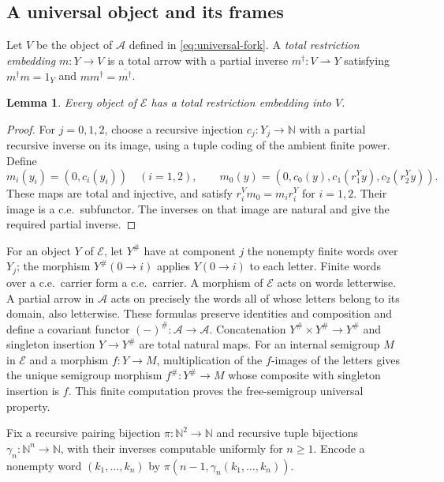 \documentclass[11pt]{article}
\newtheorem{lemma}[theorem]{Lemma}
\newcommand{\N}{\mathbb N}
\begin{document}
\subsection{A universal object and its frames}

Let $V$ be the object of $\mathcal A$ defined in
\eqref{eq:universal-fork}.
A \emph{total restriction embedding} $m:Y\to V$ is a total
arrow with a partial inverse $m^\dagger:V\rightharpoonup Y$
satisfying $m^\dagger m=1_Y$ and $mm^\dagger=\overline{m^\dagger}$.

\begin{lemma}\label{lem:fork-dominance}
Every object of $\mathcal E$ has a total restriction embedding
into $V$.
\end{lemma}
\begin{proof}
For $j=0,1,2$, choose a recursive injection $c_j:Y_j\to\N$
with a partial recursive inverse on its image, using a tuple
coding of the ambient finite power. Define
\[
 m_i(y_i)=(0,c_i(y_i))\quad(i=1,2),\qquad
 m_0(y)=(0,c_0(y),c_1(r_1^Yy),c_2(r_2^Yy)).
\]
These maps are total and injective, and satisfy
$r_i^Vm_0=m_i r_i^Y$ for $i=1,2$.
Their image is a c.e.\ subfunctor. The inverses on that image
are natural and give the required partial inverse.
\end{proof}

For an object $Y$ of $\mathcal E$, let $Y^\#$ have at component $j$ the
nonempty finite words over $Y_j$; the morphism $Y^\#(0\to i)$
applies $Y(0\to i)$ to each letter. Finite words over a c.e.\ carrier form
a c.e.\ carrier. A morphism of $\mathcal E$ acts on words letterwise.
A partial arrow in $\mathcal A$ acts on precisely the words all of whose
letters belong to its domain, also letterwise. These formulas
preserve identities and composition and define a covariant functor
$(-)^\#:\mathcal A\to\mathcal A$. Concatenation
$Y^\#\times Y^\#\to Y^\#$ and singleton insertion
$Y\to Y^\#$ are total natural maps. For an internal semigroup $M$
in $\mathcal E$ and a morphism $f:Y\to M$, multiplication of the
$f$-images of the letters gives the unique semigroup morphism
$f^\#:Y^\#\to M$ whose composite with singleton insertion is $f$.
This finite computation proves the free-semigroup universal property.

Fix a recursive pairing bijection
$\pi:\N^2\to\N$ and recursive tuple bijections
$\gamma_n:\N^n\to\N$, with their inverses computable uniformly
for $n\ge1$. Encode a nonempty word $(k_1,\ldots,k_n)$ by
$\pi(n-1,\gamma_n(k_1,\ldots,k_n))$.
\end{document}
